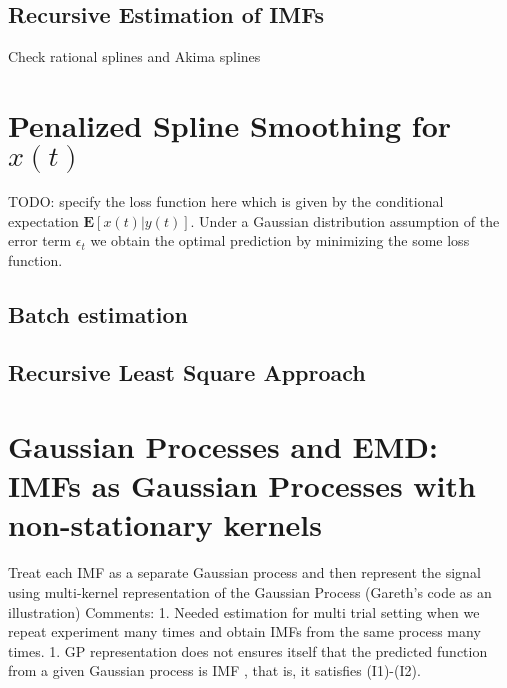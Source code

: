 \documentclass[article,moreauthors,pdftex,10pt,a4paper]{ssrn}
\begin{document}
%
%

\subsection{Recursive Estimation of IMFs}
Check rational splines and Akima splines

\section{Penalized Spline Smoothing for $x(t)$ }
TODO: specify the loss function here
which is given by the conditional expectation $\mathbf{E}[x(t)|y(t)]$. Under a Gaussian distribution assumption of the error term $\epsilon_t$ we obtain the optimal prediction by minimizing the some loss function.

\subsection{Batch estimation}

\subsection{Recursive Least Square Approach}

\section{Gaussian Processes and EMD: IMFs as  Gaussian Processes with non-stationary kernels}
Treat each IMF as a separate Gaussian process and then represent the signal using multi-kernel representation of the Gaussian Process (Gareth's code as an illustration)
Comments:
1. Needed estimation for multi trial setting when we repeat experiment many times and obtain IMFs from the same process many times.
1. GP representation does not ensures itself that the predicted function from a given Gaussian process is IMF , that is, it satisfies (I1)-(I2).
\end{document}
